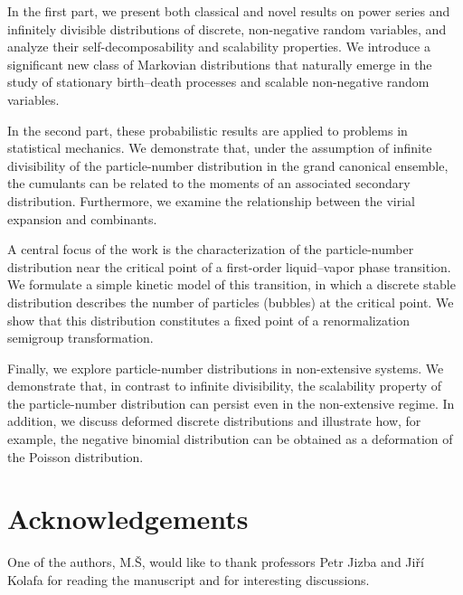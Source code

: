 \documentclass[a4paper,12pt]{amsart}
\theoremstyle{definition}
\theoremstyle{remark}
\begin{document}
In the first part, we present both classical and novel results on power series and infinitely divisible distributions of discrete, non-negative random variables, and analyze their self-decomposability and scalability properties. We introduce a significant new class of Markovian distributions that naturally emerge in the study of stationary birth–death processes and scalable non-negative random variables.

In the second part, these probabilistic results are applied to problems in statistical mechanics. We demonstrate that, under the assumption of infinite divisibility of the particle-number distribution in the grand canonical ensemble, the cumulants can be related to the moments of an associated secondary distribution. Furthermore, we examine the relationship between the virial expansion and combinants.

A central focus of the work is the characterization of the particle-number distribution near the critical point of a first-order liquid–vapor phase transition. We formulate a simple kinetic model of this transition, in which a discrete stable distribution describes the number of particles (bubbles) at the critical point. We show that this distribution constitutes a fixed point of a renormalization semigroup transformation.

Finally, we explore particle-number distributions in non-extensive systems. We demonstrate that, in contrast to infinite divisibility, the scalability property of the particle-number distribution can persist even in the non-extensive regime. In addition, we discuss deformed discrete distributions and illustrate how, for example, the negative binomial distribution can be obtained as a deformation of the Poisson distribution.

\section*{Acknowledgements}
  One of the authors, M.\v{S}, would like to thank professors Petr Jizba and Ji\v{r}\'i Kolafa for reading the manuscript and for interesting discussions.
\newpage

\appendix
\end{document}
